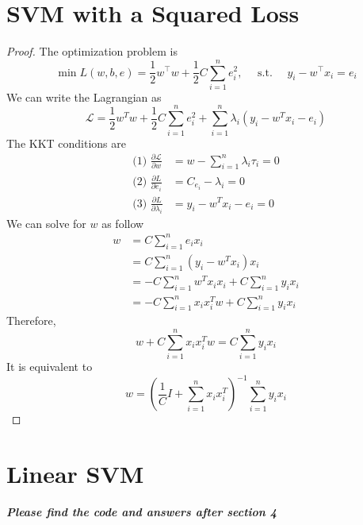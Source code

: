 \documentclass{article}
\begin{document}
\section{SVM with a Squared Loss}
\begin{proof}
The optimization problem is
\begin{equation}\min L(w, b, e)=\frac{1}{2} w^{\top} w+\frac{1}{2} C \sum_{i=1}^{n} e_{i}^{2}, \quad \text { s.t. } \quad y_{i}-w^{\top} x_{i}=e_{i}\end{equation}
We can write the Lagrangian as
\begin{equation}\mathcal{L}=\frac{1}{2} w^{T} w+\frac{1}{2} C \sum_{i=1}^{n} e_{i}^{2}+\sum_{i=1}^{n} \lambda_{i}\left(y_{i}-w^{T} x_{i}-e_{i}\right)\end{equation}
The KKT conditions are
\begin{equation}\begin{split}
\text{(1)   }\frac{\partial \mathcal{L}}{\partial w}&=w-\sum_{i=1}^{n} \lambda_{i} \tau_{i}=0 \\
\text{(2)   }\frac{\partial L}{\partial e_{i}}&=C_{e_{i}}-\lambda_{i}=0 \\
\text{(3)   }\frac{\partial L}{\partial \lambda_{i}}&=y_{i}-w^{T} x_{i}-e_{i}=0
\end{split}\end{equation}
We can solve for $w$ as follow
\begin{equation}\begin{aligned}
w &=C \sum_{i=1}^{n} e_{i} x_{i} \\
&=C \sum_{i=1}^{n}\left(y_{i}-w^{T} x_{i}\right) x_{i}\\
&=-C \sum_{i=1}^{n} w^{T} x_{i} x_{i}+C \sum_{i=1}^{n} y_{i} x_{i}\\
&= -C \sum_{i=1}^{n} x_{i} x_i^T w + C \sum_{i=1}^{n} y_{i} x_{i}
\end{aligned}\end{equation}
Therefore,
\begin{equation}w+C \sum_{i=1}^{n} x_{i} x_{i}^{T} w=C \sum_{i=1}^{n} y_{i} x_{i}\end{equation}
It is equivalent to 
\begin{equation}w=\left(\frac{1}{C} I+\sum_{i=1}^{n} x_{i} x_{i}^{T}\right)^{-1} \sum_{i=1}^{n} y_{i} x_{i}\end{equation}


\end{proof}


\section{Linear SVM}
\textbf{\textit{Please find the code and answers after section 4}}
\end{document}
